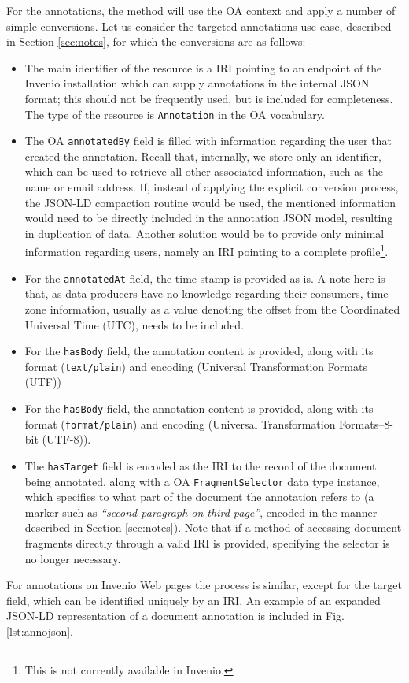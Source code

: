 For the annotations, the method will use the OA context and apply a number of
simple conversions. Let us consider the targeted annotations use-case,
described in Section \ref{sec:notes}, for which the conversions are as follows:
\begin{itemize}
  \item The main identifier of the resource is a IRI pointing to an endpoint of
        the Invenio installation which can supply annotations in the internal
        JSON format; this should not be frequently used, but is included for
        completeness. The type of the resource is \texttt{Annotation} in the
        OA vocabulary.
  \item The OA \texttt{annotatedBy} field is filled with information regarding
        the user that created the annotation. Recall that, internally, we store
        only an identifier, which can be used to retrieve all other associated
        information, such as the name or email address. If, instead of applying
        the explicit conversion process, the JSON-LD compaction routine would be
        used, the mentioned information would need to be directly included in
        the annotation JSON model, resulting in duplication of data. Another
        solution would be to provide only minimal information regarding users,
        namely an IRI pointing to a complete profile\footnote{This is not
        currently available in Invenio.}.
  \item For the \texttt{annotatedAt} field, the time stamp is provided as-is. A
        note here is that, as data producers have no knowledge regarding their
        consumers, time zone information, usually as a value denoting the offset
        from the Coordinated Universal Time (UTC), needs to be included.
  \item For the \texttt{hasBody} field, the annotation content is provided, along
        with its format (\texttt{text/plain}) and encoding (Universal
        Transformation Formats (UTF))
  \item For the \texttt{hasBody} field, the annotation content is provided, along
        with its format (\texttt{format/plain}) and encoding (Universal
        Transformation Formats--8-bit (UTF-8)).
  \item The \texttt{hasTarget} field is encoded as the IRI to the record of the
        document being annotated, along with a OA \texttt{FragmentSelector}
        data type instance, which specifies to what part of the document the
        annotation refers to (a marker such as \textit{``second paragraph on
        third page''}, encoded in the manner described in
        Section \ref{sec:notes}). Note that if a method of accessing document
        fragments directly through a valid IRI is provided, specifying the
        selector is no longer necessary.
\end{itemize}
For annotations on Invenio Web pages the process is similar, except for the
target field, which can be identified uniquely by an IRI. An example of an
expanded JSON-LD representation of a document annotation is included in Fig.
\ref{lst:annojson}.

